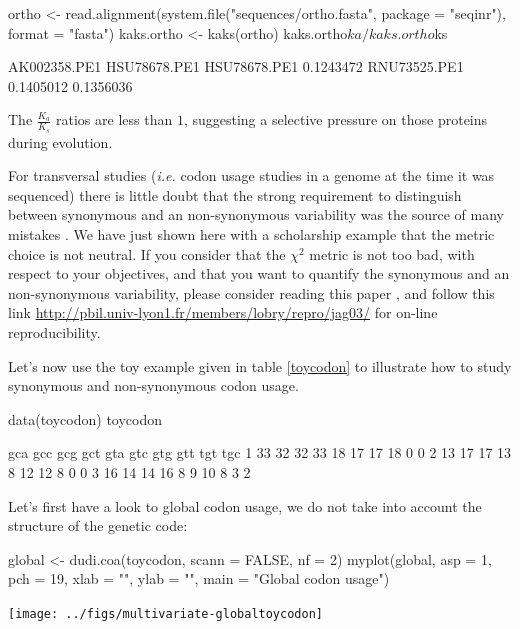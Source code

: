 \documentclass{article}
\begin{document}
\begin{Schunk}
\begin{Sinput}
 ortho <- read.alignment(system.file("sequences/ortho.fasta", 
     package = "seqinr"), format = "fasta")
 kaks.ortho <- kaks(ortho)
 kaks.ortho$ka/kaks.ortho$ks
\end{Sinput}
\begin{Soutput}
             AK002358.PE1 HSU78678.PE1
HSU78678.PE1    0.1243472             
RNU73525.PE1    0.1405012    0.1356036
\end{Soutput}
\end{Schunk}

The  $\frac{K_{a}}{K_{s}}$ ratios are less than $1$, suggesting a selective 
pressure on those proteins during evolution.

For transversal studies (\textit{i.e.} codon usage studies in a genome at the time it was sequenced)
there is little doubt that the strong requirement to distinguish between synonymous and an non-synonymous
variability was the source of many mistakes \cite{misuse}. We have just shown here with a scholarship
example that the metric choice is not neutral. If you consider that the $\chi^{2}$ metric is not too bad,
with respect to your objectives, and that you want to quantify the synonymous and an non-synonymous
variability, please consider reading this paper \cite{lobrychessel}, and follow this link
\url{http://pbil.univ-lyon1.fr/members/lobry/repro/jag03/} for on-line reproducibility.

Let's now use the toy example given in table \ref{toycodon} to illustrate how to study synonymous
and non-synonymous codon usage.

\begin{Schunk}
\begin{Sinput}
 data(toycodon)
 toycodon
\end{Sinput}
\begin{Soutput}
  gca gcc gcg gct gta gtc gtg gtt tgt tgc
1  33  32  32  33  18  17  17  18   0   0
2  13  17  17  13   8  12  12   8   0   0
3  16  14  14  16   8   9  10   8   3   2
\end{Soutput}
\end{Schunk}



Let's first have a look to global codon usage, we do not take into account the structure
of the genetic code:

\begin{Schunk}
\begin{Sinput}
 global <- dudi.coa(toycodon, scann = FALSE, nf = 2)
 myplot(global, asp = 1, pch = 19, xlab = "", ylab = "", main = "Global codon usage")
\end{Sinput}
\end{Schunk}
\texttt{[image: ../figs/multivariate-globaltoycodon]}
\end{document}
